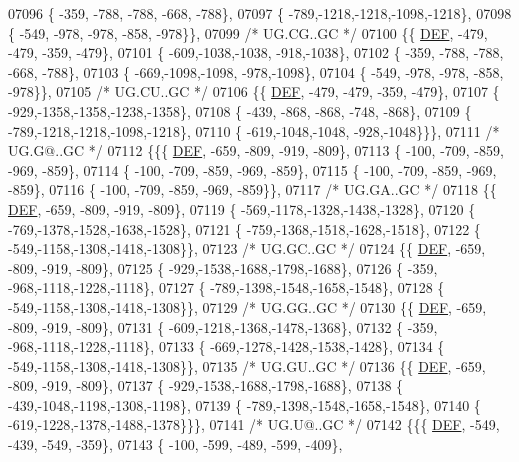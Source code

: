 \begin{DoxyCode}
07096 \{ -359, -788, -788, -668, -788\},
07097 \{ -789,-1218,-1218,-1098,-1218\},
07098 \{ -549, -978, -978, -858, -978\}\},
07099 \textcolor{comment}{/* UG.CG..GC */}
07100 \{\{  \mbox{\hyperlink{1_88_84__epars_8h_a397419fc12b37ed479c8abb9d444d843}{DEF}}, -479, -479, -359, -479\},
07101 \{ -609,-1038,-1038, -918,-1038\},
07102 \{ -359, -788, -788, -668, -788\},
07103 \{ -669,-1098,-1098, -978,-1098\},
07104 \{ -549, -978, -978, -858, -978\}\},
07105 \textcolor{comment}{/* UG.CU..GC */}
07106 \{\{  \mbox{\hyperlink{1_88_84__epars_8h_a397419fc12b37ed479c8abb9d444d843}{DEF}}, -479, -479, -359, -479\},
07107 \{ -929,-1358,-1358,-1238,-1358\},
07108 \{ -439, -868, -868, -748, -868\},
07109 \{ -789,-1218,-1218,-1098,-1218\},
07110 \{ -619,-1048,-1048, -928,-1048\}\}\},
07111 \textcolor{comment}{/* UG.G@..GC */}
07112 \{\{\{  \mbox{\hyperlink{1_88_84__epars_8h_a397419fc12b37ed479c8abb9d444d843}{DEF}}, -659, -809, -919, -809\},
07113 \{ -100, -709, -859, -969, -859\},
07114 \{ -100, -709, -859, -969, -859\},
07115 \{ -100, -709, -859, -969, -859\},
07116 \{ -100, -709, -859, -969, -859\}\},
07117 \textcolor{comment}{/* UG.GA..GC */}
07118 \{\{  \mbox{\hyperlink{1_88_84__epars_8h_a397419fc12b37ed479c8abb9d444d843}{DEF}}, -659, -809, -919, -809\},
07119 \{ -569,-1178,-1328,-1438,-1328\},
07120 \{ -769,-1378,-1528,-1638,-1528\},
07121 \{ -759,-1368,-1518,-1628,-1518\},
07122 \{ -549,-1158,-1308,-1418,-1308\}\},
07123 \textcolor{comment}{/* UG.GC..GC */}
07124 \{\{  \mbox{\hyperlink{1_88_84__epars_8h_a397419fc12b37ed479c8abb9d444d843}{DEF}}, -659, -809, -919, -809\},
07125 \{ -929,-1538,-1688,-1798,-1688\},
07126 \{ -359, -968,-1118,-1228,-1118\},
07127 \{ -789,-1398,-1548,-1658,-1548\},
07128 \{ -549,-1158,-1308,-1418,-1308\}\},
07129 \textcolor{comment}{/* UG.GG..GC */}
07130 \{\{  \mbox{\hyperlink{1_88_84__epars_8h_a397419fc12b37ed479c8abb9d444d843}{DEF}}, -659, -809, -919, -809\},
07131 \{ -609,-1218,-1368,-1478,-1368\},
07132 \{ -359, -968,-1118,-1228,-1118\},
07133 \{ -669,-1278,-1428,-1538,-1428\},
07134 \{ -549,-1158,-1308,-1418,-1308\}\},
07135 \textcolor{comment}{/* UG.GU..GC */}
07136 \{\{  \mbox{\hyperlink{1_88_84__epars_8h_a397419fc12b37ed479c8abb9d444d843}{DEF}}, -659, -809, -919, -809\},
07137 \{ -929,-1538,-1688,-1798,-1688\},
07138 \{ -439,-1048,-1198,-1308,-1198\},
07139 \{ -789,-1398,-1548,-1658,-1548\},
07140 \{ -619,-1228,-1378,-1488,-1378\}\}\},
07141 \textcolor{comment}{/* UG.U@..GC */}
07142 \{\{\{  \mbox{\hyperlink{1_88_84__epars_8h_a397419fc12b37ed479c8abb9d444d843}{DEF}}, -549, -439, -549, -359\},
07143 \{ -100, -599, -489, -599, -409\},

\end{DoxyCode}
